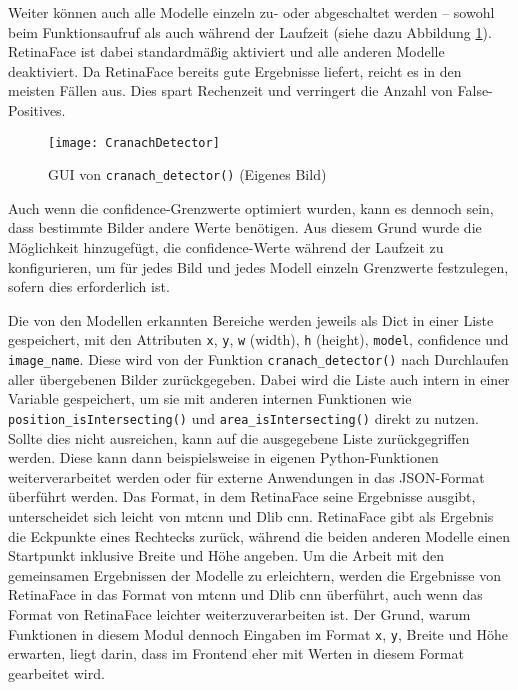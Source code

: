 Weiter können auch alle Modelle einzeln zu- oder abgeschaltet werden – sowohl beim Funktionsaufruf als auch während der Laufzeit (siehe dazu Abbildung \ref{fig:cranachDetector}). RetinaFace ist dabei standardmäßig aktiviert und alle anderen Modelle deaktiviert. Da RetinaFace bereits gute Ergebnisse liefert, reicht es in den meisten Fällen aus. Dies spart Rechenzeit und verringert die Anzahl von False-Positives.

\begin{figure}[tbh]
\centering
 \texttt{[image: CranachDetector]}
 \caption{GUI von \texttt{cranach\_detector()} (Eigenes Bild)}
 \label{fig:cranachDetector}
\end{figure} 

Auch wenn die \gls{confidence}-Grenzwerte optimiert wurden, kann es dennoch sein, dass bestimmte Bilder andere Werte benötigen. Aus diesem Grund wurde die Möglichkeit hinzugefügt, die \gls{confidence}-Werte während der Laufzeit zu konfigurieren, um für jedes Bild und jedes Modell einzeln Grenzwerte festzulegen, sofern dies erforderlich ist.

Die von den Modellen erkannten Bereiche werden jeweils als Dict in einer Liste gespeichert, mit den Attributen \texttt{x}, \texttt{y}, \texttt{w} (width), \texttt{h} (height), \texttt{model}, \gls{confidence} und \texttt{image\_name}. Diese wird von der Funktion \texttt{cranach\_detector()} nach Durchlaufen aller übergebenen Bilder zurückgegeben. Dabei wird die Liste auch intern in einer Variable gespeichert, um sie mit anderen internen Funktionen wie \texttt{position\_isIntersecting()} und \texttt{area\_isIntersecting()} direkt zu nutzen. Sollte dies nicht ausreichen, kann auf die ausgegebene Liste zurückgegriffen werden. Diese kann dann beispielsweise in eigenen Python-Funktionen weiterverarbeitet werden oder für externe Anwendungen in das JSON-Format überführt werden. Das Format, in dem RetinaFace seine Ergebnisse ausgibt, unterscheidet sich leicht von \gls{mtcnn} und Dlib \gls{cnn}. RetinaFace gibt als Ergebnis die Eckpunkte eines Rechtecks zurück, während die beiden anderen Modelle einen Startpunkt inklusive Breite und Höhe angeben. Um die Arbeit mit den gemeinsamen Ergebnissen der Modelle zu erleichtern, werden die Ergebnisse von RetinaFace in das Format von \gls{mtcnn} und Dlib \gls{cnn} überführt, auch wenn das Format von RetinaFace leichter weiterzuverarbeiten ist. Der Grund, warum Funktionen in diesem Modul dennoch Eingaben im Format \texttt{x}, \texttt{y}, Breite und Höhe erwarten, liegt darin, dass im Frontend eher mit Werten in diesem Format gearbeitet wird.

